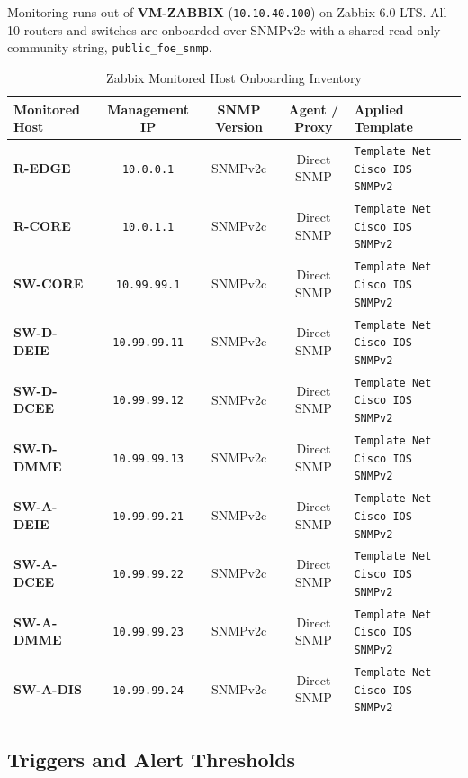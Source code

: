 \documentclass[11pt,a4paper]{article}
\begin{document}
Monitoring runs out of \textbf{VM-ZABBIX} (\texttt{10.10.40.100}) on Zabbix 6.0 LTS. All 10 routers and switches are onboarded over SNMPv2c with a shared read-only community string, \texttt{public\_foe\_snmp}.

\begin{table}[htbp]
\centering
\caption{Zabbix Monitored Host Onboarding Inventory}
\label{tab:zabbix_hosts}
\small
\begin{tabularx}{\textwidth}{@{}l c c c L@{}}
\toprule
\textbf{Monitored Host} & \textbf{Management IP} & \textbf{SNMP Version} & \textbf{Agent / Proxy} & \textbf{Applied Template} \\
\midrule
\textbf{R-EDGE} & \texttt{10.0.0.1} & SNMPv2c & Direct SNMP & \texttt{Template Net Cisco IOS SNMPv2} \\
\textbf{R-CORE} & \texttt{10.0.1.1} & SNMPv2c & Direct SNMP & \texttt{Template Net Cisco IOS SNMPv2} \\
\textbf{SW-CORE} & \texttt{10.99.99.1} & SNMPv2c & Direct SNMP & \texttt{Template Net Cisco IOS SNMPv2} \\
\textbf{SW-D-DEIE} & \texttt{10.99.99.11} & SNMPv2c & Direct SNMP & \texttt{Template Net Cisco IOS SNMPv2} \\
\textbf{SW-D-DCEE} & \texttt{10.99.99.12} & SNMPv2c & Direct SNMP & \texttt{Template Net Cisco IOS SNMPv2} \\
\textbf{SW-D-DMME} & \texttt{10.99.99.13} & SNMPv2c & Direct SNMP & \texttt{Template Net Cisco IOS SNMPv2} \\
\textbf{SW-A-DEIE} & \texttt{10.99.99.21} & SNMPv2c & Direct SNMP & \texttt{Template Net Cisco IOS SNMPv2} \\
\textbf{SW-A-DCEE} & \texttt{10.99.99.22} & SNMPv2c & Direct SNMP & \texttt{Template Net Cisco IOS SNMPv2} \\
\textbf{SW-A-DMME} & \texttt{10.99.99.23} & SNMPv2c & Direct SNMP & \texttt{Template Net Cisco IOS SNMPv2} \\
\textbf{SW-A-DIS} & \texttt{10.99.99.24} & SNMPv2c & Direct SNMP & \texttt{Template Net Cisco IOS SNMPv2} \\
\bottomrule
\end{tabularx}
\end{table}

\subsection{Triggers and Alert Thresholds}
\end{document}
